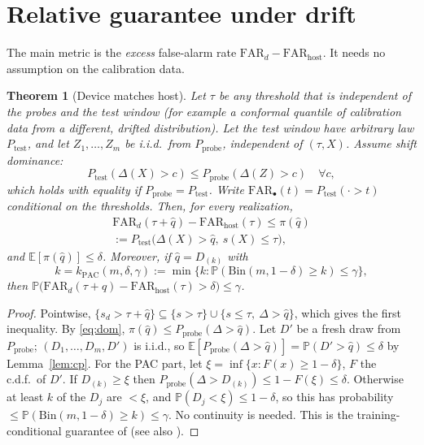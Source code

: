\documentclass[conference]{IEEEtran}
\newtheorem{theorem}{Theorem}
\theoremstyle{definition}
\theoremstyle{remark}
\newcommand{\Prob}{\mathbb P}
\newcommand{\E}{\mathbb E}
\newcommand{\FAR}{\mathrm{FAR}}
\begin{document}
\section{Relative guarantee under drift}\label{sec:rel}
The main metric is the \emph{excess} false-alarm rate $\FAR_d-\FAR_{\mathrm{host}}$. It needs no assumption on the calibration data.

\begin{theorem}[Device matches host]\label{thm:rel}
Let $\tau$ be any threshold that is independent of the probes and the test window (for example a conformal quantile of calibration data from a \emph{different, drifted} distribution). Let the test window have arbitrary law $P_{\mathrm{test}}$, and let $Z_1,\dots,Z_m$ be i.i.d.\ from $P_{\mathrm{probe}}$, independent of $(\tau,X)$. Assume shift dominance:
\begin{equation}\label{eq:dom}
P_{\mathrm{test}}(\Delta(X)>c)\le P_{\mathrm{probe}}(\Delta(Z)>c)\quad\forall c,
\end{equation}
which holds with equality if $P_{\mathrm{probe}}=P_{\mathrm{test}}$. Write $\FAR_{\bullet}(t)=P_{\mathrm{test}}(\cdot>t)$ conditional on the thresholds. Then, for every realization,
\begin{multline*}\FAR_d(\tau+\hat q)-\FAR_{\mathrm{host}}(\tau)\le\pi(\hat q)\\:=P_{\mathrm{test}}\bigl(\Delta(X)>\hat q,\ s(X)\le\tau\bigr),\end{multline*}
and $\E[\pi(\hat q)]\le\delta$. Moreover, if $\hat q=D_{(k)}$ with
\[k=k_{\mathrm{PAC}}(m,\delta,\gamma):=\min\{k:\Prob(\mathrm{Bin}(m,1-\delta)\ge k)\le\gamma\},\]
then $\Prob\bigl(\FAR_d(\tau+\hat q)-\FAR_{\mathrm{host}}(\tau)>\delta\bigr)\le\gamma$.
\end{theorem}
\begin{proof}
Pointwise, $\{s_d>\tau+\hat q\}\subseteq\{s>\tau\}\cup\{s\le\tau,\ \Delta>\hat q\}$, which gives the first inequality. By \eqref{eq:dom}, $\pi(\hat q)\le P_{\mathrm{probe}}(\Delta>\hat q)$. Let $D'$ be a fresh draw from $P_{\mathrm{probe}}$; $(D_1,\dots,D_m,D')$ is i.i.d., so $\E[P_{\mathrm{probe}}(\Delta>\hat q)]=\Prob(D'>\hat q)\le\delta$ by Lemma~\ref{lem:cp}. For the PAC part, let $\xi=\inf\{x:F(x)\ge1-\delta\}$, $F$ the c.d.f.\ of $D'$. If $D_{(k)}\ge\xi$ then $P_{\mathrm{probe}}(\Delta>D_{(k)})\le 1-F(\xi)\le\delta$. Otherwise at least $k$ of the $D_j$ are $<\xi$, and $\Prob(D_j<\xi)\le1-\delta$, so this has probability $\le\Prob(\mathrm{Bin}(m,1-\delta)\ge k)\le\gamma$. No continuity is needed. This is the training-conditional guarantee of \cite{vovk2012} (see also \cite{bates2021rcps}).
\end{proof}
\end{document}

